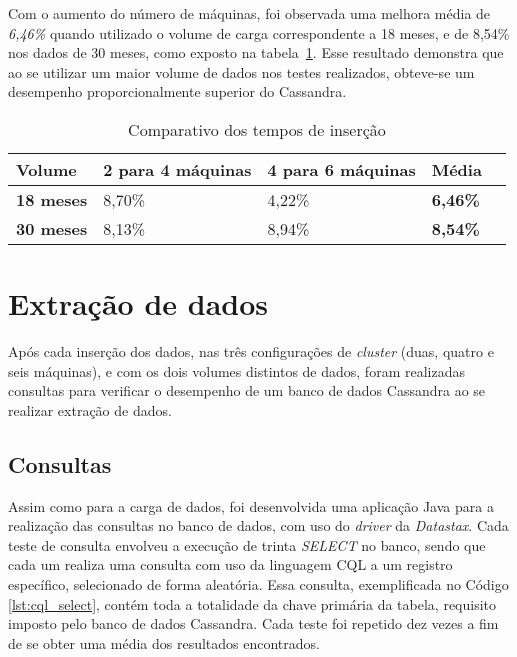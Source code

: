 Com o aumento do número de máquinas, foi observada uma melhora média de \emph{6,46\%} quando utilizado o volume de carga correspondente a 18 meses, e de {8,54\%} nos dados de 30 meses, como exposto na tabela~\ref{tb:comparativo_insert}. Esse resultado demonstra que ao se utilizar um maior volume de dados nos testes realizados, obteve-se um desempenho proporcionalmente superior do Cassandra.

\begin{table}[]
	\centering
	\caption{Comparativo dos tempos de inserção}
	\label{tb:comparativo_insert}
	\begin{tabular}{lllll}
		\textbf{Volume} 	& \textbf{2 para 4 máquinas} & \textbf{4 para 6 máquinas} & \textbf{Média}  &  \\ \hline
		\textbf{18 meses} 	& 8,70\%                     & 4,22\%                     & \textbf{6,46\%} &  \\ \hline
		\textbf{30 meses}	& 8,13\%                     & 8,94\%                     & \textbf{8,54\%} &  \\ \hline
	\end{tabular}
\end{table}


\section{Extração de dados}
Após cada inserção dos dados, nas três configurações de \emph{cluster} (duas, quatro e seis máquinas), e com os dois volumes distintos de dados, foram realizadas consultas para verificar o desempenho de um banco de dados Cassandra ao se realizar extração de dados.

\subsection{Consultas}
Assim como para a carga de dados, foi desenvolvida uma aplicação Java para a realização das consultas no banco de dados, com uso do \emph{driver} da \emph{Datastax}. Cada teste de consulta envolveu a execução de trinta \emph{SELECT} no banco, sendo que cada um realiza uma consulta com uso da linguagem CQL a um registro específico, selecionado de forma aleatória. Essa consulta, exemplificada no Código \ref{lst:cql_select}, contém toda a totalidade da chave primária da tabela, requisito imposto pelo banco de dados Cassandra. Cada teste foi repetido dez vezes a fim de se obter uma média dos resultados encontrados.

